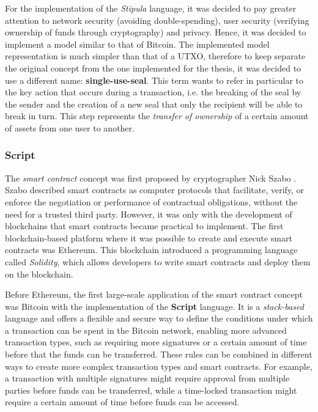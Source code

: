 For the implementation of the \textit{Stipula} language, it was decided to pay greater attention to network 
security (avoiding double-spending), user security (verifying ownership of funds through cryptography) and 
privacy. Hence, it was decided to implement a model similar to that of Bitcoin. The implemented 
model representation is much simpler than that of a UTXO, therefore to keep separate the original concept 
from the one implemented for the thesis, it was decided to use a different name: \textbf{single-use-seal}. 
This term wants to refer in particular to the key action that occurs during a transaction, i.e. the breaking 
of the seal by the sender and the creation of a new seal that only the recipient will be able to break in 
turn. This step represents the \textit{transfer of ownership} of a certain amount of assets from one user to 
another.

\subsubsection{Script}
\label{script-language}

The \textit{smart contract} concept was first proposed by cryptographer Nick Szabo 
\autocite{site:smart-contract-szabo}. Szabo described smart contracts as computer protocols that facilitate, 
verify, or enforce the negotiation or performance of contractual obligations, without the need for a trusted 
third party. However, it was only with the development of blockchains that smart contracts became practical to 
implement. The first blockchain-based platform where it was possible to create and execute smart contracts was 
Ethereum. This blockchain introduced a programming language called \textit{Solidity}, which allows developers 
to write smart contracts and deploy them on the blockchain.

Before Ethereum, the first large-scale application of the smart contract concept was Bitcoin with the 
implementation of the \textbf{Script} language. It is a \textit{stack-based} language and offers a flexible 
and secure way to define the conditions under which a transaction can be spent in the Bitcoin network, 
enabling more advanced transaction types, such as requiring more signatures or a certain amount of time 
before that the funds can be transferred. These rules can be combined in different ways to create more 
complex transaction types and smart contracts. For example, a transaction with multiple signatures might 
require approval from multiple parties before funds can be transferred, while a time-locked transaction 
might require a certain amount of time before funds can be accessed.

